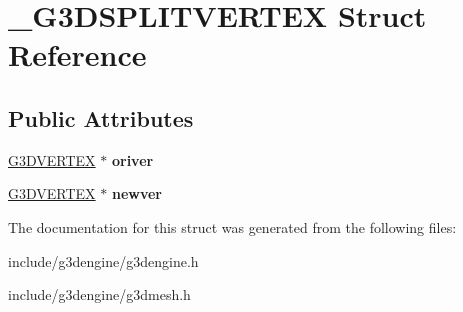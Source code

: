 \hypertarget{struct__G3DSPLITVERTEX}{}\section{\+\_\+\+G3\+D\+S\+P\+L\+I\+T\+V\+E\+R\+T\+EX Struct Reference}
\label{struct__G3DSPLITVERTEX}
\subsection*{Public Attributes}
\begin{DoxyCompactItemize}
\item 
\mbox{\label{struct__G3DSPLITVERTEX_a653bacf864039ed2aa879862abe992e5}} 
\hyperlink{struct__G3DVERTEX}{G3\+D\+V\+E\+R\+T\+EX} $\ast$ {\bfseries oriver}
\item 
\mbox{\label{struct__G3DSPLITVERTEX_a830d06b556db6c3f6e52334e24919a80}} 
\hyperlink{struct__G3DVERTEX}{G3\+D\+V\+E\+R\+T\+EX} $\ast$ {\bfseries newver}
\end{DoxyCompactItemize}


The documentation for this struct was generated from the following files\+:\begin{DoxyCompactItemize}
\item 
include/g3dengine/g3dengine.\+h\item 
include/g3dengine/g3dmesh.\+h\end{DoxyCompactItemize}
